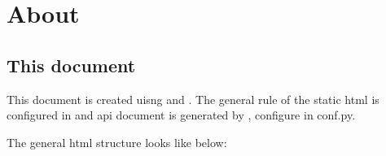 \documentclass[letterpaper,10pt,english]{sphinxmanual}
\begin{document}
\chapter{About}
\label{\detokenize{about:about}}\label{\detokenize{about::doc}}

\section{This document}
\label{\detokenize{about:this-document}}
This document is created uisng  and . The general rule of the static html is configured in  and api document is generated by , configure in conf.py.

The general html structure looks like below:
\end{document}
